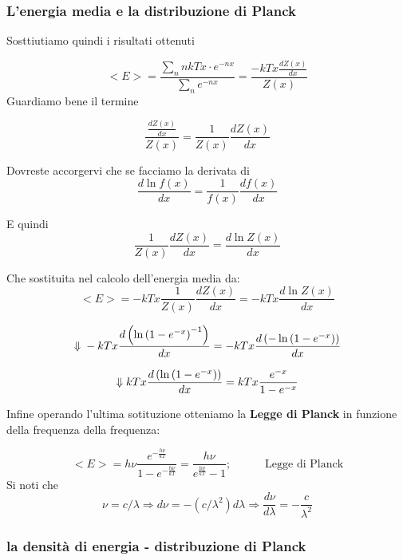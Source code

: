 \documentclass[11pt]{article}
\begin{document}
    \hypertarget{lenergia-media-e-la-distribuzione-di-planck}{%
\subsubsection{L'energia media e la distribuzione di
Planck}\label{lenergia-media-e-la-distribuzione-di-planck}}

Sosttiutiamo quindi i risultati ottenuti

\[
<E> = \frac{\sum_{n}nkTx\cdot e^{-nx}}{\sum_{n}  e^{-nx}} = \frac{-kTx  \frac{dZ(x)}{dx}}{Z(x)}
\] Guardiamo bene il termine

    \[
\frac{\frac{dZ(x)}{dx}}{Z(x)} = \frac{1}{Z(x)}\frac{dZ(x)}{dx}
\]

    Dovreste accorgervi che se facciamo la derivata di \[
\frac{d\ln{f(x)}}{dx} = \frac{1}{f(x)}\frac{df(x)}{dx}
\]

    E quindi \[
 \frac{1}{Z(x)}\frac{dZ(x)}{dx} = \frac{d\ln{Z(x)}}{dx} 
\]

    Che sostituita nel calcolo dell'energia media da: \[
 <E> = -kTx\frac{1}{Z(x)}\frac{dZ(x)}{dx}  = -kTx \frac{d\ln{Z(x)}}{dx}
\]

    \[
\Downarrow\\
\, \\
 -kTx \frac{d\left (\ln{\left ( 1-e^{-x}\right )^{-1}}\right )}{dx} = -kTx \frac{d\left (-\ln{\left ( 1-e^{-x}\right )}\right )}{dx}
\]

    \[
\Downarrow
\\
\, \\
kTx \frac{d\left (\ln{\left ( 1-e^{-x}\right )}\right )}{dx} =  kTx \frac{e^{-x}}{ 1-e^{-x}} 
\]

    Infine operando l'ultima sotituzione otteniamo la \textbf{Legge di
Planck} in funzione della frequenza della frequenza:

\[
<E> = h\nu \frac{e^{-\frac{h\nu}{kT}}}{1-e^{-\frac{h\nu}{kT}}} =  \frac{h\nu}{e^{\frac{h\nu}{kT}}-1};\quad\quad\quad \text{Legge di Planck}
\] Si noti che \[
\nu=c / \lambda \Rightarrow d \nu=-\left(c / \lambda^{2}\right) d \lambda \Rightarrow \frac{d \nu}{d \lambda}=-\frac{c}{\lambda^{2}}
\]

    \hypertarget{la-densituxe0-di-energia---distribuzione-di-planck}{%
\subsubsection{la densità di energia - distribuzione di
Planck}\label{la-densituxe0-di-energia---distribuzione-di-planck}}
\end{document}

